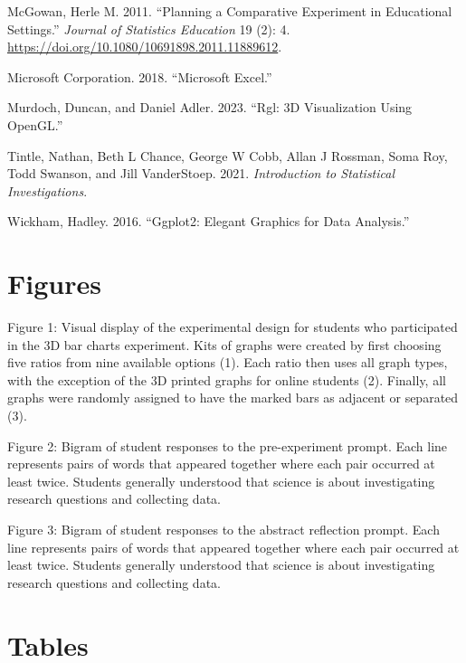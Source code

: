 \documentclass[
]{article}
\newlength{\cslhangindent}
\newenvironment{CSLReferences}[2] %
 {\begin{list}{}{%
  \setlength{\itemindent}{0pt}
  \setlength{\leftmargin}{0pt}
  \setlength{\parsep}{0pt}
  \ifodd #1
   \setlength{\leftmargin}{\cslhangindent}
   \setlength{\itemindent}{-1\cslhangindent}
  \fi
  \setlength{\itemsep}{#2\baselineskip}}}
 {\end{list}}
\begin{document}
\begin{CSLReferences}{1}{0}
McGowan, Herle M. 2011. {``Planning a Comparative Experiment in
Educational Settings.''} \emph{Journal of Statistics Education} 19 (2):
4. \url{https://doi.org/10.1080/10691898.2011.11889612}.

Microsoft Corporation. 2018. {``Microsoft Excel.''}

Murdoch, Duncan, and Daniel Adler. 2023. {``Rgl: 3D Visualization Using
OpenGL.''}

Tintle, Nathan, Beth L Chance, George W Cobb, Allan J Rossman, Soma Roy,
Todd Swanson, and Jill VanderStoep. 2021. \emph{Introduction to
Statistical Investigations}.

Wickham, Hadley. 2016. {``Ggplot2: Elegant Graphics for Data
Analysis.''}

\end{CSLReferences}

\section{Figures}\label{figures}

Figure 1: Visual display of the experimental design for students who
participated in the 3D bar charts experiment. Kits of graphs were
created by first choosing five ratios from nine available options (1).
Each ratio then uses all graph types, with the exception of the 3D
printed graphs for online students (2). Finally, all graphs were
randomly assigned to have the marked bars as adjacent or separated (3).

Figure 2: Bigram of student responses to the pre-experiment prompt. Each
line represents pairs of words that appeared together where each pair
occurred at least twice. Students generally understood that science is
about investigating research questions and collecting data.

Figure 3: Bigram of student responses to the abstract reflection prompt.
Each line represents pairs of words that appeared together where each
pair occurred at least twice. Students generally understood that science
is about investigating research questions and collecting data.

\section{Tables}\label{tables}
\end{document}
